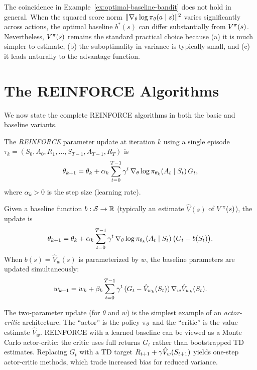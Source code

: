 \documentclass[11pt,a4paper]{article}
\begin{document}
\begin{warning}[title={Optimal Baseline $\neq$ Value Function in General}]
The coincidence in Example~\ref{ex:optimal-baseline-bandit} does not hold
in general. When the squared score norm
$\|\nabla_\theta \log \pi_\theta(a \mid s)\|^2$ varies significantly
across actions, the optimal baseline $b^*(s)$ can differ substantially
from $V^{\pi}(s)$. Nevertheless, $V^{\pi}(s)$ remains the standard practical
choice because (a) it is much simpler to estimate, (b) the suboptimality
in variance is typically small, and (c) it leads naturally to the
advantage function.
\end{warning}

\section{The REINFORCE Algorithms}

We now state the complete REINFORCE algorithms in both the basic and
baseline variants.

\begin{definition}
\label{def:reinforce-update}
The \emph{REINFORCE} parameter update at iteration $k$ using a single
episode $\tau_k = (S_0, A_0, R_1, \ldots, S_{T-1}, A_{T-1}, R_T)$ is
\[
  \theta_{k+1} = \theta_k + \alpha_k \sum_{t=0}^{T-1}
  \gamma^t\, \nabla_\theta \log \pi_{\theta_k}(A_t \mid S_t)\, G_t,
\]
where $\alpha_k > 0$ is the step size (learning rate).
\end{definition}

\begin{definition}
\label{def:reinforce-baseline-update}
Given a baseline function $b : \mathcal{S} \to \mathbb{R}$ (typically an estimate
$\hat{V}(s)$ of $V^{\pi}(s)$), the update is
\[
  \theta_{k+1} = \theta_k + \alpha_k \sum_{t=0}^{T-1}
  \gamma^t\, \nabla_\theta \log \pi_{\theta_k}(A_t \mid S_t)\,
  \bigl(G_t - b(S_t)\bigr).
\]
When $b(s) = \hat{V}_w(s)$ is parameterized by $w$, the baseline
parameters are updated simultaneously:
\[
  w_{k+1} = w_k + \beta_k \sum_{t=0}^{T-1} \gamma^t\,
  (G_t - \hat{V}_{w_k}(S_t))\, \nabla_w \hat{V}_{w_k}(S_t).
\]
\end{definition}

\begin{rlconnection}
The two-parameter update (for $\theta$ and $w$) is the simplest example
of an \emph{actor-critic} architecture. The ``actor'' is the policy
$\pi_\theta$ and the ``critic'' is the value estimate $\hat{V}_w$.
REINFORCE with a learned baseline can be viewed as a Monte Carlo
actor-critic: the critic uses full returns $G_t$ rather than bootstrapped
TD estimates. Replacing $G_t$ with a TD target
$R_{t+1} + \gamma \hat{V}_w(S_{t+1})$ yields one-step actor-critic
methods, which trade increased bias for reduced variance.
\end{rlconnection}
\end{document}
